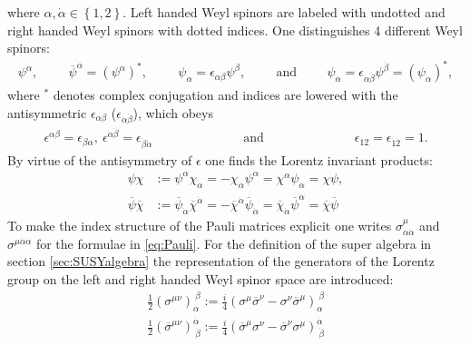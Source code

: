 where $\alpha,\dot{\alpha} \in \left\{ 1,2 \right\}$. Left handed Weyl spinors are labeled with undotted and right handed Weyl spinors with dotted indices. One distinguishes 4 different Weyl spinors:
\begin{align}
\psi^\alpha, \hspace{1cm} 
\overline{\psi}^{\dot{\alpha}} = (\psi^\alpha)^\ast, \hspace{1cm} \psi_\alpha = \epsilon_{\alpha\beta}\psi^\beta, \hspace{1cm} \mathrm{and} \hspace{1cm} \psi_{\dot{\alpha}} = \epsilon_{\dot{\alpha}\dot{\beta}}\psi^{\dot{\beta}} = (\psi_\alpha)^\ast,
\end{align}
where $^\ast$ denotes complex conjugation and indices are lowered with the antisymmetric $\epsilon_{\alpha\beta}$ ($\epsilon_{\dot{\alpha}\dot{\beta}}$), which obeys
\begin{align}
\epsilon^{\alpha\beta} = \epsilon_{\beta\alpha},\ \epsilon^{\dot{\alpha}\dot{\beta}} = \epsilon_{\dot{\beta}\dot{\alpha}} \hspace{3cm} \mathrm{and} \hspace{3cm} \epsilon_{12} = \epsilon_{\dot{1}\dot{2}}= 1.
\end{align}
By virtue of the antisymmetry of $\epsilon$ one finds the Lorentz invariant products:
\begin{align}
\psi\chi &:= \psi^\alpha\chi_\alpha = -\chi_\alpha\psi^\alpha = \chi^\alpha\psi_\alpha = \chi\psi,\nonumber\\
\overline{\psi}\overline{\chi} &:= \overline{\psi}_{\dot{\alpha}} \overline{\chi}^{\dot{\alpha}} = -\overline{\chi}^{\dot{\alpha}}\overline{\psi}_{\dot{\alpha}} = \overline{\chi}_{\dot{\alpha}}\overline{\psi}^{\dot{\alpha}} = \overline{\chi}\overline{\psi} \label{eq:Weylspinorproduct}
\end{align}
To make the index structure of the Pauli matrices explicit one writes $\sigma^\mu_{\alpha\dot{\alpha}}$ and $\sigma^{\mu\dot{\alpha}\alpha}$ for the formulae in \ref{eq:Pauli}. For the definition of the super algebra in section \ref{sec:SUSYalgebra} the representation of the generators of the Lorentz group on the left and right handed Weyl spinor space are introduced:
\begin{align}
\frac{1}{2}(\sigma^{\mu\nu})_\alpha^{\ \beta} := \frac{i}{4}(\sigma^\mu\overline{\sigma}^\nu - \sigma^\nu\overline{\sigma}^\mu)_\alpha^{\ \beta}\nonumber\\
\frac{1}{2}(\overline{\sigma}^{\mu\nu})^{\dot{\alpha}}_{\ \dot{\beta}} := \frac{i}{4}(\overline{\sigma}^\mu\sigma^\nu - \overline{\sigma}^\nu\sigma^\mu)^{\dot{\alpha}}_{\ \dot{\beta}}
\end{align}

